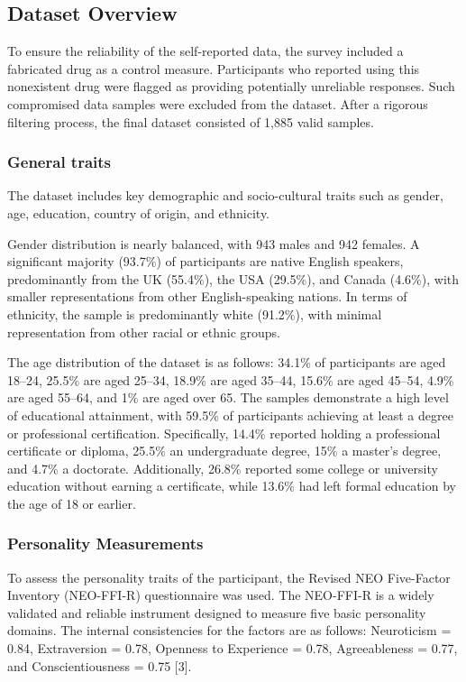 \documentclass{article}
\begin{document}
\subsection{Dataset Overview}
\hspace{1cm}To ensure the reliability of the self-reported data, the survey included a fabricated drug as a control measure. Participants who reported using this nonexistent drug were flagged as providing potentially unreliable responses. Such compromised data samples were excluded from the dataset. After a rigorous filtering process, the final dataset consisted of 1,885 valid samples.

\subsubsection{General traits}
\hspace{1cm}The dataset includes key demographic and socio-cultural traits such as gender, age, education, country of origin, and ethnicity. 

\hspace{1cm}Gender distribution is nearly balanced, with 943 males and 942 females. A significant majority (93.7\%) of participants are native English speakers, predominantly from the UK (55.4\%), the USA (29.5\%), and Canada (4.6\%), with smaller representations from other English-speaking nations. In terms of ethnicity, the sample is predominantly white (91.2\%), with minimal representation from other racial or ethnic groups.

\hspace{1cm}The age distribution of the dataset is as follows: 34.1\% of participants are aged 18–24, 25.5\% are aged 25–34, 18.9\% are aged 35–44, 15.6\% are aged 45–54, 4.9\% are aged 55–64, and 1\% are aged over 65. The samples demonstrate a high level of educational attainment, with 59.5\% of participants achieving at least a degree or professional certification. Specifically, 14.4\% reported holding a professional certificate or diploma, 25.5\% an undergraduate degree, 15\% a master’s degree, and 4.7\% a doctorate. Additionally, 26.8\% reported some college or university education without earning a certificate, while 13.6\% had left formal education by the age of 18 or earlier.



\subsubsection{Personality Measurements}
\hspace{1cm}To assess the personality traits of the participant, the Revised NEO Five-Factor Inventory (NEO-FFI-R) questionnaire was used. The NEO-FFI-R is a widely validated and reliable instrument designed to measure five basic personality domains. The internal consistencies for the factors are as follows: Neuroticism = 0.84, Extraversion = 0.78, Openness to Experience = 0.78, Agreeableness = 0.77, and Conscientiousness = 0.75 [3]. 
\end{document}
